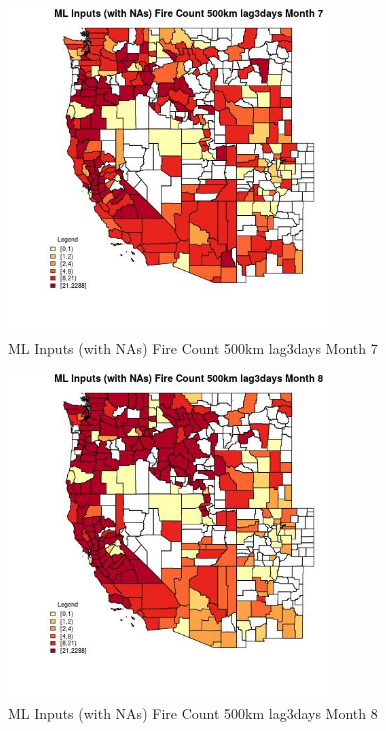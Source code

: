 \begin{figure} 
\centering  
\includegraphics[width=0.77\textwidth]{Code_Outputs/Report_ML_input_PM25_Step4_part_e_de_duplicated_aves_compiled_2019-05-21wNAs_CountyFire_Count_500km_lag3daysmedianMonth7.jpg} 
\caption{\label{fig:Report_ML_input_PM25_Step4_part_e_de_duplicated_aves_compiled_2019-05-21wNAsCountyFire_Count_500km_lag3daysmedianMonth7}ML Inputs (with NAs) Fire Count 500km lag3days Month 7} 
\end{figure} 
 

\begin{figure} 
\centering  
\includegraphics[width=0.77\textwidth]{Code_Outputs/Report_ML_input_PM25_Step4_part_e_de_duplicated_aves_compiled_2019-05-21wNAs_CountyFire_Count_500km_lag3daysmedianMonth8.jpg} 
\caption{\label{fig:Report_ML_input_PM25_Step4_part_e_de_duplicated_aves_compiled_2019-05-21wNAsCountyFire_Count_500km_lag3daysmedianMonth8}ML Inputs (with NAs) Fire Count 500km lag3days Month 8} 
\end{figure} 
 

